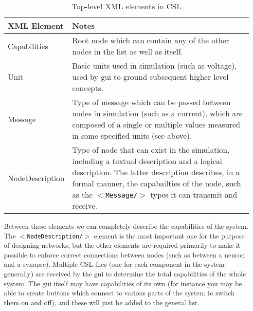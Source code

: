 \documentclass[pdftex,a4paper]{article}
\newcommand{\XML}[2][]{{\tt \small $<$#2#1/$>$}}
\begin{document}
\begin{table}[!h]
  \begin{center}
    \caption{Top-level XML elements in CSL}
    \label{tab:desc_node}
    \begin{tabular}{|l|p{2.5in}|}
      \hline

      \textbf{XML Element} & \textbf{Notes}\\

      \hline

      Capabilities & Root node which can contain any of the other
      nodes in the list as well as itself.\\

      \hline

      Unit & Basic units used in simulation (such as voltage), used by
      gui to ground subsequent higher level concepts.\\

      \hline

      Message & Type of message which can be passed between nodes in
      simulation (such as a current), which are composed of a single
      or multiple values measured in some specified units (see
      above).\\


      \hline

      NodeDescription & Type of node that can exist in the simulation,
      including a textual description and a logical description. The
      latter description describes, in a formal manner, the capabailties
      of the node, such as the \XML{Message} types it can transmit and
      receive.\\

      \hline
    \end{tabular}
  \end{center}
\end{table}

Between these elements we can completely describe the capabilities of
the system. The \XML{NodeDescription} element is the most important one
for the purpose of designing networks, but the other elements are
required primarily to make it possible to enforce correct connections
between nodes (such as between a neuron and a synapse). Multiple CSL
files (one for each component in the system generally) are received by
the gui to determine the total capabilities of the whole system. The gui
itself may have capabilities of its own (for instance you may be able to
create buttons which connect to various parts of the system to switch
them on and off), and these will just be added to the general list.
\end{document}
